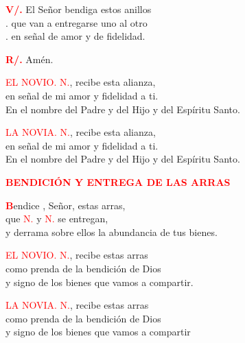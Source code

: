 \documentclass[12pt, letterpaper]{report}
\begin{document}
\Large \hspace{-0.9cm} {\bfseries \textcolor{red}{V/.}} \hspace{0.5cm} El Se\~nor bendiga \Huge \textcolor{red}{} \Large estos anillos \\
. \hspace{1cm} que van a entregarse uno al otro \\
. \hspace{1cm} en se\~nal de amor y de fidelidad. \newline

\Large \hspace{-0.9cm}  {\bfseries \textcolor{red}{R/.}} \hspace{0.5cm}  Am\'en. \newline

\textcolor{red}{EL NOVIO.} \newline
\textcolor{red}{N.}, recibe esta alianza, \\
en se\~nal de mi amor y fidelidad a ti. \\
En el nombre del Padre y del Hijo y del Esp\'iritu Santo. \newline

\textcolor{red}{LA NOVIA.} \newline
\textcolor{red}{N.}, recibe esta alianza, \\
en se\~nal de mi amor y fidelidad a ti. \\
En el nombre del Padre y del Hijo y del Esp\'iritu Santo. \newline


\Large {\bfseries \textcolor{red}{BENDICI\'ON Y ENTREGA DE LAS ARRAS}}

\lettrine[lines=1]{\bfseries \textcolor{red}{B}}{}\Large endice \Huge \textcolor{red}{},  \Large Se\~nor, estas arras, \\
que \textcolor{red}{N.} y \textcolor{red}{N.} se entregan, \\
y derrama sobre ellos la abundancia de tus bienes. \newline

\textcolor{red}{EL NOVIO.} \newline
\textcolor{red}{N.}, recibe estas arras \\
como prenda de la bendici\'on de Dios \\
y signo de los bienes que vamos a compartir. \newline

\textcolor{red}{LA NOVIA.} \newline
\textcolor{red}{N.}, recibe estas arras \\
como prenda de la bendici\'on de Dios \\
y signo de los bienes que vamos a compartir \newline
\end{document}
